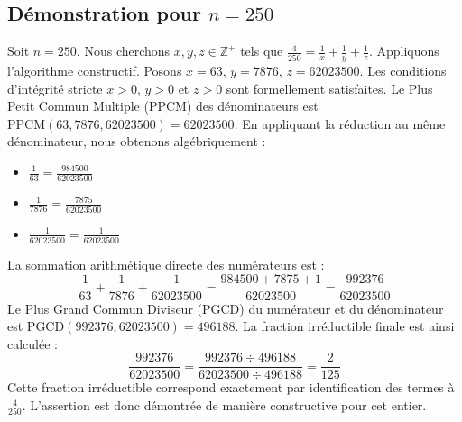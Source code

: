 \documentclass[11pt,a4paper]{article}
\begin{document}
\subsection{Démonstration pour $n = 250$}
Soit $n = 250$. Nous cherchons $x, y, z \in \mathbb{Z}^{+}$ tels que $\frac{4}{250} = \frac{1}{x} + \frac{1}{y} + \frac{1}{z}$.
Appliquons l'algorithme constructif. Posons $x = 63$, $y = 7876$, $z = 62023500$.
Les conditions d'intégrité stricte $x > 0$, $y > 0$ et $z > 0$ sont formellement satisfaites.
Le Plus Petit Commun Multiple (PPCM) des dénominateurs est $\text{PPCM}(63, 7876, 62023500) = 62023500$.
En appliquant la réduction au même dénominateur, nous obtenons algébriquement :
\begin{itemize}
    \item $\frac{1}{63} = \frac{984500}{62023500}$
    \item $\frac{1}{7876} = \frac{7875}{62023500}$
    \item $\frac{1}{62023500} = \frac{1}{62023500}$
\end{itemize}
La sommation arithmétique directe des numérateurs est :
$$ \frac{1}{63} + \frac{1}{7876} + \frac{1}{62023500} = \frac{984500 + 7875 + 1}{62023500} = \frac{992376}{62023500} $$
Le Plus Grand Commun Diviseur (PGCD) du numérateur et du dénominateur est $\text{PGCD}(992376, 62023500) = 496188$.
La fraction irréductible finale est ainsi calculée :
$$ \frac{992376}{62023500} = \frac{992376 \div 496188}{62023500 \div 496188} = \frac{2}{125} $$
Cette fraction irréductible correspond exactement par identification des termes à $\frac{4}{250}$. L'assertion est donc démontrée de manière constructive pour cet entier.
\end{document}
